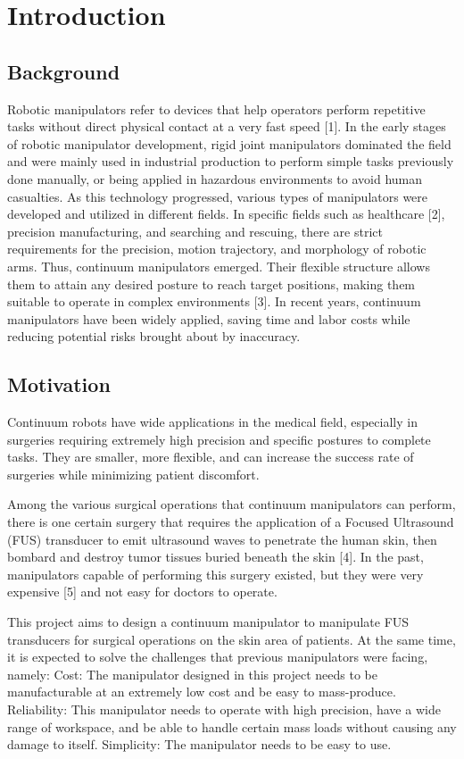 \section{Introduction} 
\subsection{Background}
Robotic manipulators refer to devices that help operators perform repetitive tasks without direct physical contact at a very 
fast speed [1]. In the early stages of robotic manipulator development, rigid joint manipulators dominated the field and were 
mainly used in industrial production to perform simple tasks previously done manually, or being applied in hazardous environments 
to avoid human casualties. As this technology progressed, various types of manipulators were developed and utilized in different 
fields. In specific fields such as healthcare [2], precision manufacturing, and searching and rescuing, there are strict 
requirements for the precision, motion trajectory, and morphology of robotic arms. Thus, continuum manipulators emerged. 
Their flexible structure allows them to attain any desired posture to reach target positions, making them suitable to operate 
in complex environments [3]. In recent years, continuum manipulators have been widely applied, saving time and labor costs while 
reducing potential risks brought about by inaccuracy. 

\subsection{Motivation}
Continuum robots have wide applications in the medical field, especially in surgeries requiring extremely high precision and 
specific postures to complete tasks. They are smaller, more flexible, and can increase the success rate of surgeries while 
minimizing patient discomfort. 

Among the various surgical operations that continuum manipulators can perform, there is one certain surgery that requires the 
application of a Focused Ultrasound (FUS) transducer to emit ultrasound waves to penetrate the human skin, then bombard and 
destroy tumor tissues buried beneath the skin [4]. In the past, manipulators capable of performing this surgery existed, but 
they were very expensive [5] and not easy for doctors to operate.

This project aims to design a continuum manipulator to manipulate FUS transducers for surgical operations on the skin area 
of patients. At the same time, it is expected to solve the challenges that previous manipulators were facing, namely:
Cost: The manipulator designed in this project needs to be manufacturable at an extremely low cost and be easy to mass-produce.
Reliability: This manipulator needs to operate with high precision, have a wide range of workspace, and be able to handle certain mass 
loads without causing any damage to itself.
Simplicity: The manipulator needs to be easy to use.

